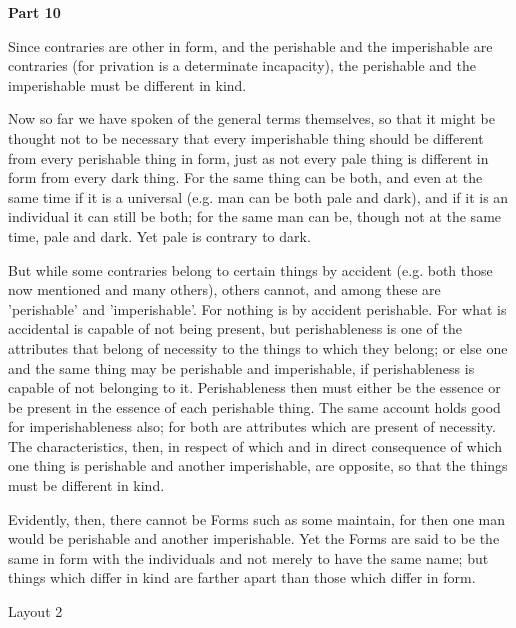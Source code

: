 \textbf{Part 10}

Since contraries are other in form, and the perishable and the imperishable are contraries (for privation is a determinate incapacity), the perishable and the imperishable must be different in kind.

Now so far we have spoken of the general terms themselves, so that it might be thought not to be necessary that every imperishable thing should be different from every perishable thing in form, just as not every pale thing is different in form from every dark thing. For the same thing can be both, and even at the same time if it is a universal (e.g. man can be both pale and dark), and if it is an individual it can still be both; for the same man can be, though not at the same time, pale and dark. Yet pale is contrary to dark.

But while some contraries belong to certain things by accident (e.g. both those now mentioned and many others), others cannot, and among these are 'perishable' and 'imperishable'. For nothing is by accident perishable. For what is accidental is capable of not being present, but perishableness is one of the attributes that belong of necessity to the things to which they belong; or else one and the same thing may be perishable and imperishable, if perishableness is capable of not belonging to it. Perishableness then must either be the essence or be present in the essence of each perishable thing. The same account holds good for imperishableness also; for both are attributes which are present of necessity. The characteristics, then, in respect of which and in direct consequence of which one thing is perishable and another imperishable, are opposite, so that the things must be different in kind.

Evidently, then, there cannot be Forms such as some maintain, for then one man would be perishable and another imperishable. Yet the Forms are said to be the same in form with the individuals and not merely to have the same name; but things which differ in kind are farther apart than those which differ in form.


Layout 2

